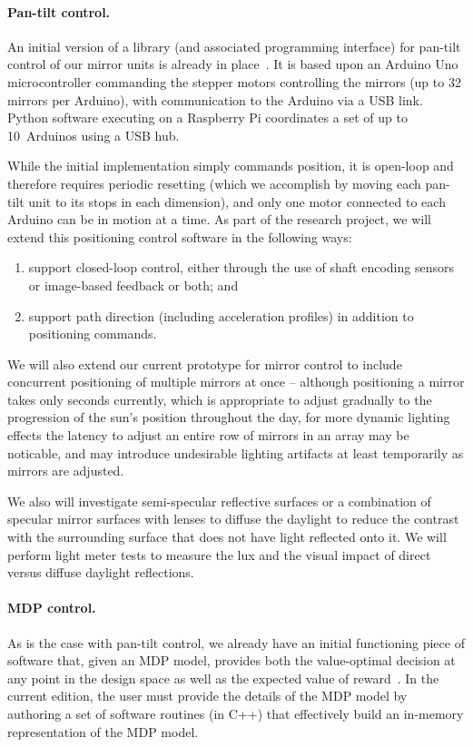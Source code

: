 \paragraph{Pan-tilt control.}
An initial version of a library (and associated programming interface) 
for pan-tilt control of our mirror units is already in place~\cite{Mitchell18}.
It is based upon an Arduino Uno microcontroller commanding the stepper
motors controlling the mirrors (up to 32 mirrors per Arduino),
with communication to the Arduino via a USB link.  Python software 
executing on a Raspberry Pi coordinates a set of up to 10~Arduinos using a USB hub.

While the initial implementation simply commands position, it is open-loop
and therefore requires periodic resetting (which we accomplish by moving each
pan-tilt unit to its stops in each dimension), and only one motor 
connected to each Arduino can be in motion at a time.
As part of the research project, we will extend this positioning control
software in the following ways:
\begin{enumerate}

\item support closed-loop control, either through the use of shaft encoding
sensors or image-based feedback or both; and

\item support path direction (including acceleration profiles) in addition
to positioning commands.

\end{enumerate}

We will also extend our current prototype for mirror control to include concurrent 
positioning of multiple mirrors at once -- although positioning a mirror takes only 
seconds currently, which is appropriate to adjust gradually to the progression of 
the sun's position throughout the day, for more dynamic lighting effects the latency 
to adjust an entire row of mirrors in an array may be noticable, and may introduce 
undesirable lighting artifacts at least temporarily as mirrors are adjusted.

We also will investigate semi-specular reflective surfaces or a
combination of specular mirror surfaces with lenses to diffuse the
daylight to reduce the contrast with the surrounding surface that does
not have light reflected onto it. We will perform light meter tests to
measure the lux and the visual impact of direct versus diffuse
daylight reflections.

\paragraph{MDP control.}
As is the case with pan-tilt control, we already have an initial functioning
piece of software that, given an MDP model, provides both the
value-optimal decision at any point in the design space as well as
the expected value of reward~\cite{mskgct13,tggs10}.
In the current edition, the user must provide the details of the MDP model
by authoring a set of software routines (in C++) that effectively build
an in-memory representation of the MDP model.

